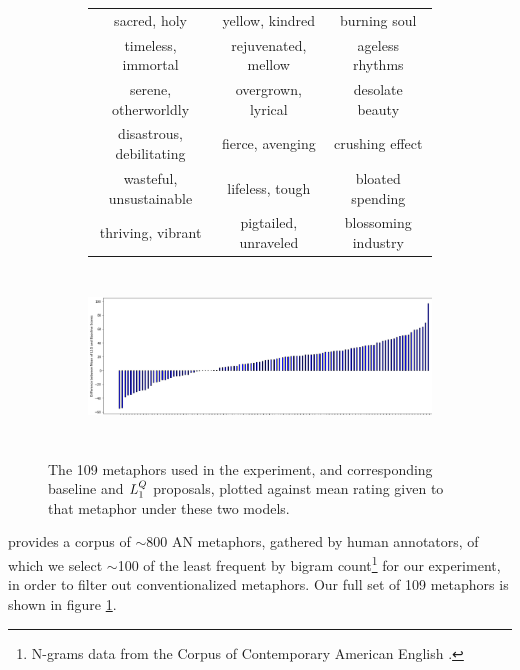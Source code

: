 \documentclass[OpenMind]{stjour}
\newcommand{\Listener}{L}
\newcommand{\QLONE}{\Listener_{{1}}^{{Q}}}
\begin{document}
\begin{figure}
\begin{subfigure}{0.3\textwidth}
\begin{center}
\begin{tabular}{ c | c | c  }
			\tiny sacred, holy & \tiny yellow, kindred & \tiny burning soul\\
			\tiny timeless, immortal & \tiny rejuvenated, mellow & \tiny ageless rhythms\\
			\tiny serene, otherworldly & \tiny overgrown, lyrical & \tiny desolate beauty\\
			\tiny disastrous, debilitating & \tiny fierce, avenging & \tiny crushing effect\\
			\tiny wasteful, unsustainable & \tiny lifeless, tough & \tiny bloated spending\\
			\tiny thriving, vibrant & \tiny pigtailed, unraveled & \tiny blossoming industry\\
			 
			\end{tabular}
			\end{center}
		\end{subfigure}\begin{subfigure}{0.5\textwidth}
			\vspace*{-1.35cm}\hspace{10em}\includegraphics[width=21.3cm,height=4.5cm,angle=270]{images/resultsbarplot.png}
		\end{subfigure}
			\caption{The 109 metaphors used in the experiment, and corresponding baseline and $\protect\QLONE$ proposals, plotted against mean rating given to that metaphor under these two models. 
			}
			\label{fig:barplot}
		\end{figure}

		\citep{tsvetkov2014metaphor} provides a corpus of $\sim$800 AN metaphors, gathered by human annotators, of which we select $\sim$100 of the least frequent by bigram count\footnote{N-grams data from the Corpus of Contemporary American English \citep{davies2011word}.} for our experiment, in order to filter out conventionalized metaphors. Our full set of 109 metaphors is shown in figure \ref{fig:barplot}.
\end{document}
